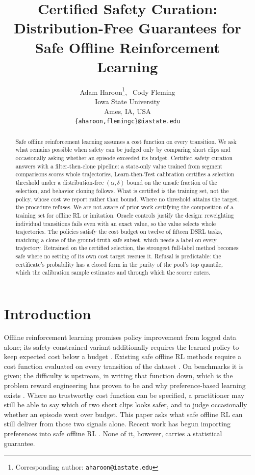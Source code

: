 \documentclass{article} %
\title{Certified Safety Curation: Distribution-Free Guarantees for Safe Offline Reinforcement Learning}
\author{Adam Haroon\thanks{Corresponding author: \texttt{aharoon@iastate.edu}}, \ Cody Fleming \\
Iowa State University\\
Ames, IA, USA\\
\texttt{\{aharoon,flemingc\}@iastate.edu}}
\begin{document}
\maketitle
{}

\begin{abstract}
Safe offline reinforcement learning assumes a cost function on every transition. We ask what remains possible when safety can be judged only by comparing short clips and occasionally asking whether an episode exceeded its budget. Certified safety curation answers with a filter-then-clone pipeline: a state-only value trained from segment comparisons scores whole trajectories, Learn-then-Test calibration certifies a selection threshold under a distribution-free $(\alpha, \delta)$ bound on the unsafe fraction of the selection, and behavior cloning follows. What is certified is the training set, not the policy, whose cost we report rather than bound. Where no threshold attains the target, the procedure refuses. We are not aware of prior work certifying the composition of a training set for offline RL or imitation. Oracle controls justify the design: reweighting individual transitions fails even with an exact value, so the value selects whole trajectories. The policies satisfy the cost budget on twelve of fifteen DSRL tasks, matching a clone of the ground-truth safe subset, which needs a label on every trajectory. Retrained on the certified selection, the strongest full-label method becomes safe where no setting of its own cost target rescues it. Refusal is predictable: the certificate's probability has a closed form in the purity of the pool's top quantile, which the calibration sample estimates and through which the scorer enters.
\end{abstract}

\section{Introduction}
\label{sec:intro}

Offline reinforcement learning promises policy improvement from logged data alone; its safety-constrained variant additionally requires the learned policy to keep expected cost below a budget \citep{liu2024dsrl}. Existing safe offline RL methods require a cost function evaluated on every transition of the dataset \citep{liu2023cdt, zheng2024fisor, gong2025trac}. On benchmarks it is given; the difficulty is upstream, in writing that function down, which is the problem reward engineering has proven to be and why preference-based learning exists \citep{christiano2017deep}. Where no trustworthy cost function can be specified, a practitioner may still be able to say which of two short clips looks safer, and to judge occasionally whether an episode went over budget. This paper asks what safe offline RL can still deliver from those two signals alone. Recent work has begun importing preferences into safe offline RL \citep{gong2026presa, burnwal2026osil}. None of it, however, carries a statistical guarantee.
\end{document}
